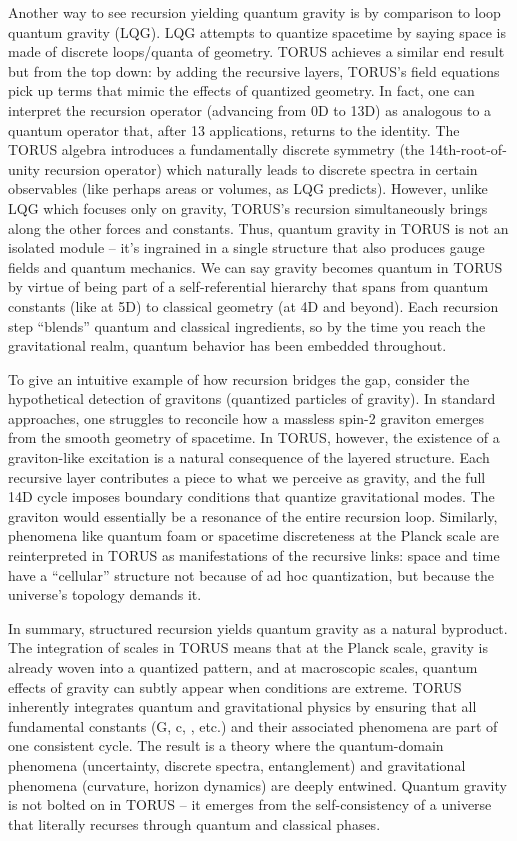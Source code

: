 \documentclass[]{article}
\begin{document}
Another way to see recursion yielding quantum gravity is by comparison
to loop quantum gravity (LQG). LQG attempts to quantize spacetime by
saying space is made of discrete loops/quanta of geometry. TORUS
achieves a similar end result but from the top down: by adding the
recursive layers, TORUS's field equations pick up terms that mimic the
effects of quantized geometry. In fact, one can interpret the recursion
operator (advancing from 0D to 13D) as analogous to a quantum operator
that, after 13 applications, returns to the identity. The TORUS algebra
introduces a fundamentally discrete symmetry (the 14th-root-of-unity
recursion operator) which naturally leads to discrete spectra in certain
observables (like perhaps areas or volumes, as LQG predicts). However,
unlike LQG which focuses only on gravity, TORUS's recursion
simultaneously brings along the other forces and constants. Thus,
quantum gravity in TORUS is not an isolated module -- it's ingrained in
a single structure that also produces gauge fields and quantum
mechanics. We can say gravity becomes quantum in TORUS by virtue of
being part of a self-referential hierarchy that spans from quantum
constants (like \hbar at 5D) to classical geometry (at 4D and beyond). Each
recursion step ``blends'' quantum and classical ingredients, so by the
time you reach the gravitational realm, quantum behavior has been
embedded throughout.

To give an intuitive example of how recursion bridges the gap, consider
the hypothetical detection of gravitons (quantized particles of
gravity). In standard approaches, one struggles to reconcile how a
massless spin-2 graviton emerges from the smooth geometry of spacetime.
In TORUS, however, the existence of a graviton-like excitation is a
natural consequence of the layered structure. Each recursive layer
contributes a piece to what we perceive as gravity, and the full 14D
cycle imposes boundary conditions that quantize gravitational modes. The
graviton would essentially be a resonance of the entire recursion loop.
Similarly, phenomena like quantum foam or spacetime discreteness at the
Planck scale are reinterpreted in TORUS as manifestations of the
recursive links: space and time have a ``cellular'' structure not
because of ad hoc quantization, but because the universe's topology
demands it.

In summary, structured recursion yields quantum gravity as a natural
byproduct. The integration of scales in TORUS means that at the Planck
scale, gravity is already woven into a quantized pattern, and at
macroscopic scales, quantum effects of gravity can subtly appear when
conditions are extreme. TORUS inherently integrates quantum and
gravitational physics by ensuring that all fundamental constants (G, c,
\hbar, etc.) and their associated phenomena are part of one consistent
cycle. The result is a theory where the quantum-domain phenomena
(uncertainty, discrete spectra, entanglement) and gravitational
phenomena (curvature, horizon dynamics) are deeply entwined. Quantum
gravity is not bolted on in TORUS -- it emerges from the
self-consistency of a universe that literally recurses through quantum
and classical phases.
\end{document}
